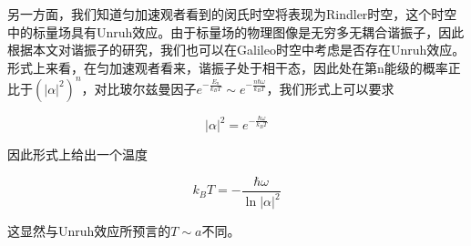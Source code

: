 \documentclass[a4paper]{article}
\begin{document}
        另一方面，我们知道匀加速观者看到的闵氏时空将表现为Rindler时空，这个时空中的标量场具有Unruh效应。由于标量场的物理图像是无穷多无耦合谐振子，因此根据本文对谐振子的研究，我们也可以在Galileo时空中考虑是否存在Unruh效应。形式上来看，在匀加速观者看来，谐振子处于相干态，因此处在第n能级的概率正比于$(|\alpha|^2)^n$，对比玻尔兹曼因子$e^{-\frac{E_n}{k_BT}}\sim e^{-\frac{n\hbar\omega}{k_BT}}$，我们形式上可以要求

        \begin{equation}
            |\alpha|^2=e^{-\frac{\hbar\omega}{k_BT}}
        \end{equation}

        因此形式上给出一个温度

        \begin{equation}
            k_BT=-\frac{\hbar\omega}{\ln|\alpha|^2}
        \end{equation}

        这显然与Unruh效应所预言的$T\sim a$不同。

        
\end{document}
